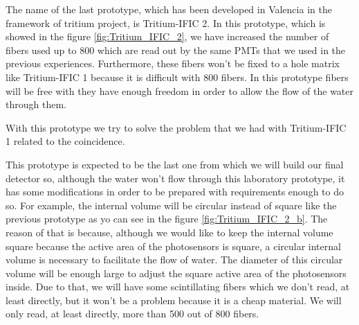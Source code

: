 The name of the last prototype, which has been developed in Valencia in the framework of tritium project, is Tritium-IFIC 2. In this prototype, which is showed in the figure \ref{fig:Tritium_IFIC_2}, we have increased the number of fibers used up to 800 which are read out by the same PMTs that we used in the previous experiences. Furthermore, these fibers won't be fixed to a hole matrix like Tritium-IFIC 1 because it is difficult with 800 fibers. In this prototype fibers will be free with they have enough freedom in order to allow the flow of the water through them. 

With this prototype we try to solve the problem that we had with Tritium-IFIC 1 related to the coincidence. 

This prototype is expected to be the last one from which we will build our final detector so, although the water won't flow through this laboratory prototype, it has some modifications in order to be prepared with requirements enough to do so. For example, the internal volume will be circular instead of square like the previous prototype as yo can see in the figure \ref{fig:Tritium_IFIC_2_b}. The reason of that is because, although we would like to keep the internal volume square because the active area of the photosensors is square, a circular internal volume is necessary to facilitate the flow of water. The diameter of this circular volume will be enough large to adjust the square active area of the photosensors inside. Due to that, we will have some scintillating fibers which we don't read, at least directly, but it won't be a problem because it is a cheap material. We will only read, at least directly, more than 500 out of 800 fibers.

